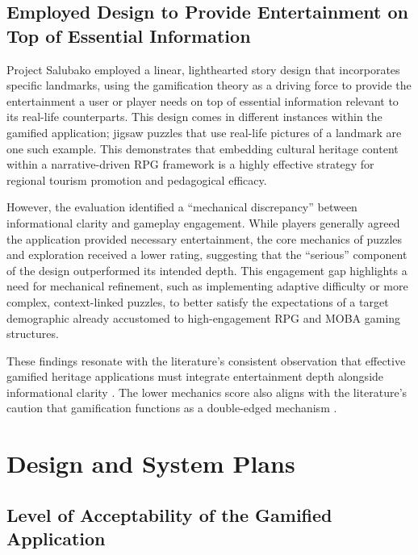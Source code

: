 \documentclass{research}
\begin{document}
\subsection{Employed Design to Provide Entertainment on Top of Essential Information}

Project Salubako employed a linear, lighthearted story design that incorporates specific
landmarks, using the gamification theory as a driving force to provide the entertainment
a user or player needs on top of essential information relevant to its real-life
counterparts. This design comes in different instances within the gamified application;
jigsaw puzzles that use real-life pictures of a landmark are one such example. This
demonstrates that embedding cultural heritage content within a narrative-driven RPG
framework is a highly effective strategy for regional tourism promotion and pedagogical
efficacy.

However, the evaluation identified a ``mechanical discrepancy'' between informational
clarity and gameplay engagement. While players generally agreed the application provided
necessary entertainment, the core mechanics of puzzles and exploration received a lower
rating, suggesting that the ``serious'' component of the design outperformed its
intended depth. This engagement gap highlights a need for mechanical refinement, such
as implementing adaptive difficulty or more complex, context-linked puzzles, to better
satisfy the expectations of a target demographic already accustomed to high-engagement
RPG and MOBA gaming structures.

These findings resonate with the literature's consistent observation that effective
gamified heritage applications must integrate entertainment depth alongside informational
clarity \citep{ting2025,jo2025,fan2022}. The lower mechanics score also aligns with the
literature's caution that gamification functions as a double-edged mechanism
\citep{flavian2024,zhang2025,malik2024}.

\section{Design and System Plans}

\subsection{Level of Acceptability of the Gamified Application}
\end{document}
